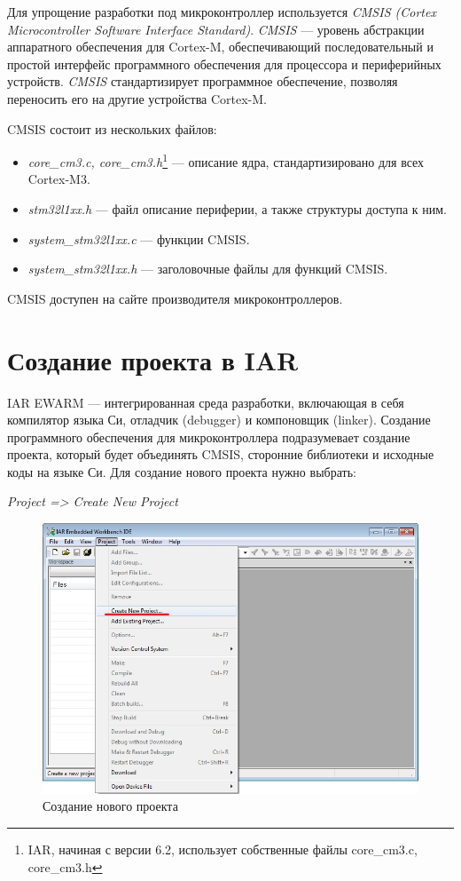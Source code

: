 Для упрощение разработки под микроконтроллер используется \textit{CMSIS (Cortex Microcontroller Software Interface Standard)}. \textit{CMSIS} --- уровень абстракции аппаратного обеспечения для Cortex-M, обеспечивающий последовательный и простой интерфейс программного обеспечения для процессора и периферийных устройств. \textit{CMSIS} стандартизирует программное обеспечение, позволяя переносить его на другие устройства Cortex-M. 

CMSIS состоит из нескольких файлов:
\begin{itemize}
\item \textit{core\_cm3.c, core\_cm3.h}\footnote{IAR, начиная с версии 6.2, использует собственные файлы core\_cm3.c, core\_cm3.h} --- описание ядра, стандартизировано для всех Cortex-M3.
\item \textit{stm32l1xx.h} --- файл описание периферии, а также структуры доступа к ним. 
\item \textit{system\_stm32l1xx.c} --- функции CMSIS. 
\item \textit{system\_stm32l1xx.h} --- заголовочные файлы для функций CMSIS.
\end{itemize}

CMSIS доступен на сайте производителя микроконтроллеров.


\section{Создание проекта в IAR}

IAR EWARM --- интегрированная среда разработки, включающая в себя компилятор языка Си, отладчик (debugger) и компоновщик (linker). Создание программного обеспечения для микроконтроллера подразумевает создание проекта, который будет объединять CMSIS, сторонние библиотеки и исходные коды на языке Си. Для создание нового проекта нужно выбрать:
\begin{center}
\textit{Project => Create New Project}
\end{center}


\begin{figure}[h!]
\begin{center}
\includegraphics[scale=0.5]{Image/4_1}
\end{center}
\caption{Создание нового проекта}
\end{figure}


